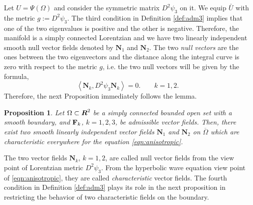\documentclass[11pt]{amsart}
\theoremstyle{plain}
\newtheorem{Prop}[Thm]{Proposition}
\numberwithin{equation}{section}
\numberwithin{Thm}{section}
\def\R{\mbox{\boldmath$R$}}
\def\N{{\mathbf N}}
\def\F{{\bf F}}
\begin{document}
Let $U=\Psi(\Omega)$ and consider the symmetric matrix $D^2 \psi_3$ on it. We equip $\bar U$ with the metric $g:=D^2 \psi_3$. The third condition in Definition \ref{def:adm3} implies that one of the two eigenvalues is positive and the other is negative. Therefore, the manifold is a simply connected Lorentzian and we have two linearly independent smooth null vector fields denoted by $\N_1$ and $\N_2$. The two \emph{null vectors} are the ones between the two eigenvectors and the distance along the integral curve is zero with respect to the metric $g$, i.e. the two null vectors will be given by the formula,
\begin{equation} \label{eqn:charformula}
    \left<\N_k, D^2\psi_3\N_k\right> = 0.\qquad k=1,2.
\end{equation}
Therefore, the next Proposition immediately follows the lemma.
\begin{Prop}\label{prop:separability} Let $\Omega\subset\R^2$  be a simply connected bounded open set with a smooth boundary, and $\F_k$, $k=1,2,3$, be admissible vector fields. Then, there exist two smooth linearly independent vector fields $\N_1$ and $\N_2$ on $\overline\Omega$ which are characteristic everywhere for the equation \eqref{eqn:anisotropic}.
\end{Prop}

The two vector fields $\N_k$, $k=1,2$, are called null vector fields from the view point of Lorentzian metric $D^2\psi_3$. From the hyperbolic wave equation view point of \eqref{eqn:anisotropic}, they are called \emph{characteristic} vector fields. The fourth condition in Definition \ref{def:adm3} plays its role in the next proposition in restricting the behavior of two characteristic fields on the boundary.
\end{document}
